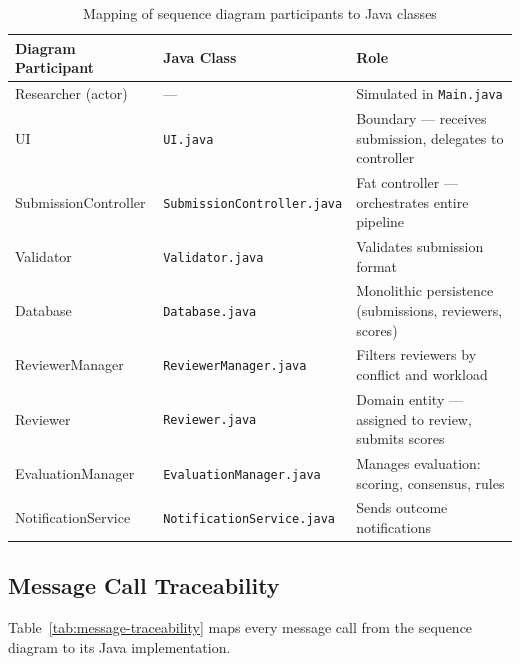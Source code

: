 \documentclass[12pt, a4paper]{article}
\begin{document}
\begin{table}[h]
\centering
\caption{Mapping of sequence diagram participants to Java classes}
\label{tab:participant-mapping}
\begin{tabularx}{\textwidth}{l l X}
    \toprule
    \textbf{Diagram Participant} & \textbf{Java Class} & \textbf{Role} \\
    \midrule
    Researcher (actor) & --- & Simulated in \texttt{Main.java} \\
    UI & \texttt{UI.java} & Boundary --- receives submission, delegates to controller \\
    SubmissionController & \texttt{SubmissionController.java} & Fat controller --- orchestrates entire pipeline \\
    Validator & \texttt{Validator.java} & Validates submission format \\
    Database & \texttt{Database.java} & Monolithic persistence (submissions, reviewers, scores) \\
    ReviewerManager & \texttt{ReviewerManager.java} & Filters reviewers by conflict and workload \\
    Reviewer & \texttt{Reviewer.java} & Domain entity --- assigned to review, submits scores \\
    EvaluationManager & \texttt{EvaluationManager.java} & Manages evaluation: scoring, consensus, rules \\
    NotificationService & \texttt{NotificationService.java} & Sends outcome notifications \\
    \bottomrule
\end{tabularx}
\end{table}

\subsection{Message Call Traceability}

Table~\ref{tab:message-traceability} maps every message call from the sequence diagram to its Java implementation.
\end{document}
